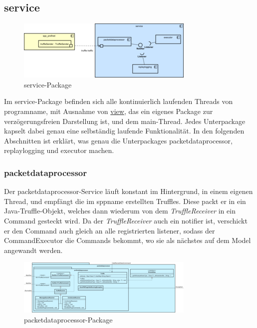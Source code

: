 \subsection{service}
\label{subsec:service}

\begin{figure}[H]
  \centering
  \includegraphics[width=\textwidth]{../diagramimages/service.png}
  \caption{service-Package}
\end{figure}

\medskip
Im service-Package befinden sich alle kontinuierlich laufenden Threads von \gls{programname},
mit Ausnahme von \hyperref[subsec:view]{view}, das ein eigenes Package zur verzögerungsfreien Darstellung ist, und dem
main-Thread. Jedes Unterpackage kapselt dabei genau eine selbständig laufende Funktionalität. In den folgenden Abschnitten ist erklärt, was genau die Unterpackages packetdataprocessor, replaylogging und executor machen.

    \subsubsection{packetdataprocessor}
    \label{subsubsec:truffleprocessor}

    Der packetdataprocessor-Service läuft konstant im Hintergrund, in einem eigenen Thread,
    und empfängt die im \gls{sppname} erstellten Truffles.
    Diese packt er in ein Java-Truffle-Objekt, welches dann wiederum von dem
    \textit{TruffleReceiver} in ein Command gesteckt wird. Da der \textit{TruffleReceiver}
    auch ein \gls{notifier} ist, verschickt er den Command auch gleich an
    alle registrierten \gls{listener}, sodass der CommandExecutor die Commands bekommt, wo sie
    als nächstes auf dem Model angewandt werden.

    \clearpage
    \begin{figure}
      \centering
      \includegraphics[width=\textwidth]{../diagramimages/packetdataprocessor.png}
      \caption{packetdataprocessor-Package}
    \end{figure}
    \clearpage

